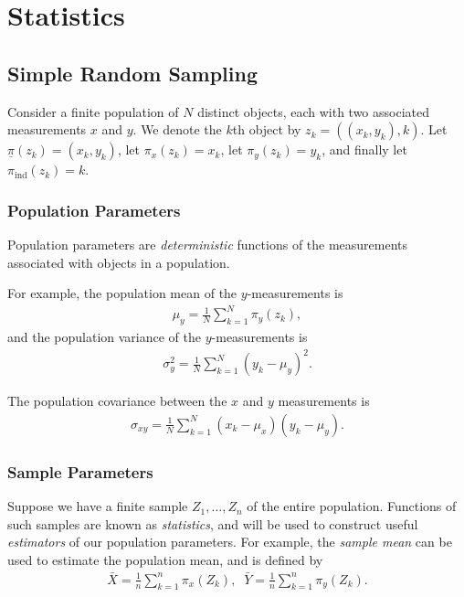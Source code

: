 \chapter{Statistics}
\label{ch:statistics}

\section{Simple Random Sampling}

Consider a finite population of $N$ distinct objects, each with two associated measurements $x$ and $y$. We denote the $k$th object by $z_k = ((x_k, y_k), k)$. Let $\underline{\pi}(z_k) = (x_k, y_k)$, let $\pi_x(z_k) = x_k$, let $\pi_y(z_k) = y_k$, and finally let $\pi_{\mathrm{ind}}(z_k) = k$.

\subsection{Population Parameters}

Population parameters are \emph{deterministic} functions of the measurements associated with objects in a population.

For example, the population mean of the $y$-measurements is
\begin{align*}
    \mu_y = \frac{1}{N}\sum_{k=1}^{N}\pi_{y}(z_k),
\end{align*}
and the population variance of the $y$-measurements is
\begin{align*}
    \sigma_{y}^2 = \frac{1}{N}\sum_{k=1}^{N}\left(y_k - \mu_y\right)^2.
\end{align*}

The population covariance between the $x$ and $y$ measurements is
\begin{align*}
    \sigma_{xy} = \frac{1}{N}\sum_{k=1}^{N}\left(x_k-\mu_x\right)\left(y_k-\mu_y\right).
\end{align*}

\subsection{Sample Parameters}

Suppose we have a finite sample $Z_1, \ldots, Z_n$ of the entire population. Functions of such samples are known as \emph{statistics}, and will be used to construct useful \emph{estimators} of our population parameters. For example, the \emph{sample mean} can be used to estimate the population mean, and is defined by
\begin{align*}
    \bar{X} = \frac{1}{n}\sum_{k=1}^{n}\pi_{x}(Z_k),\;\; \bar{Y} = \frac{1}{n}\sum_{k=1}^{n}\pi_{y}(Z_k).
\end{align*}

